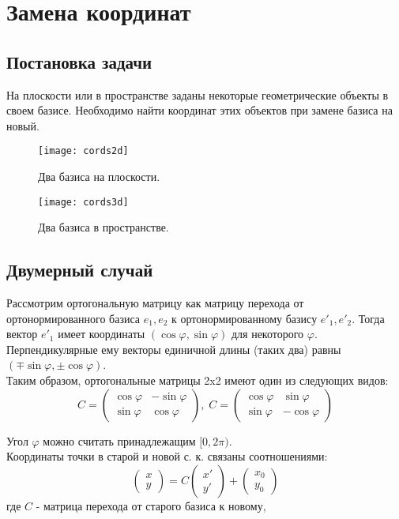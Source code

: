 \newpage
\section{Замена координат}\label{coords}

\subsection{Постановка задачи}\label{coords:task}

На плоскости или в пространстве заданы некоторые геометрические объекты в своем базисе. Необходимо найти координат этих объектов при замене базиса на новый.

\begin{figure}[h]
	{ \noindent \centering
	\texttt{[image: cords2d]}
	\caption{Два базиса на плоскости.}
	}
\end{figure}

\begin{figure}[h]
	{ \noindent \centering
	\texttt{[image: cords3d]}
	\caption{Два базиса в пространстве.}
	}
\end{figure}

\newpage
\subsection{Двумерный случай}\label{coords:alg:2dim}

Рассмотрим ортогональную матрицу как матрицу перехода от ортонормированного базиса $e_1, e_2$ к ортонормированному базису $e'_1, e'_2$. Тогда вектор $e'_1$ имеет координаты $(\cos \varphi, \sin \varphi)$ для некоторого $\varphi$. Перпендикулярные ему векторы единичной длины (таких два) равны $(\mp \sin \varphi, \pm \cos \varphi)$.\\

Таким образом, ортогональные матрицы 2x2 имеют один из следующих видов:
$$C = 
\begin{pmatrix}
	\cos \varphi & -\sin \varphi \\
	\sin \varphi & \cos \varphi
\end{pmatrix}, \; C = 
\begin{pmatrix}
	\cos \varphi & \sin \varphi \\
	\sin \varphi & -\cos \varphi
\end{pmatrix}$$

Угол $\varphi$ можно считать принадлежащим $[0, 2\pi)$.\\

Координаты точки в старой и новой с. к. связаны соотношениями:
$$\begin{pmatrix}
	x \\ y
\end{pmatrix} = C \begin{pmatrix}
	x' \\ y'
\end{pmatrix} + \begin{pmatrix}
	x_0 \\ y_0
\end{pmatrix}$$
где $C$ - матрица перехода от старого базиса к новому,

